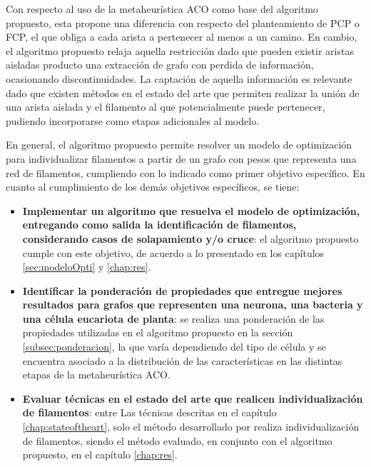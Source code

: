 Con respecto al uso de la metaheur\'istica ACO como base del algoritmo propuesto, esta propone una diferencia con respecto del planteamiento de PCP o FCP, el que obliga a cada arista a pertenecer al menos a un camino. En cambio, el algoritmo propuesto relaja aquella restricci\'on dado que pueden existir aristas aisladas producto una extracci\'on de grafo con perdida de informaci\'on, ocasionando discontinuidades. La captaci\'on de aquella informaci\'on es relevante dado que existen m\'etodos en el estado del arte que permiten realizar la uni\'on de una arista aislada y el filamento al que potencialmente puede pertenecer, pudiendo incorporarse como etapas adicionales al modelo. 

En general, el algoritmo propuesto permite resolver un modelo de optimizaci\'on para individualizar filamentos a partir de un grafo con pesos que representa una red de filamentos, cumpliendo con lo indicado como primer objetivo espec\'ifico. En cuanto al cumplimiento de los dem\'as objetivos espec\'ificos, se tiene:
\begin{itemize}
    \item {\bf Implementar un algoritmo que resuelva el modelo de optimizaci\'on, entregando como salida la identificaci\'on de filamentos, considerando casos de solapamiento y/o cruce}: el algoritmo propuesto cumple con este objetivo, de acuerdo a lo presentado en los cap\'itulos \ref{sec:modeloOpti} y \ref{chap:res}.
    
    \item {\bf Identificar la ponderaci\'on de propiedades que entregue mejores resultados para grafos que representen una neurona, una bacteria y una c\'elula eucariota de planta}: se realiza una ponderaci\'on de las propiedades utilizadas en el algoritmo propuesto en la secci\'on \ref{subsec:ponderacion}, la que var\'ia dependiendo del tipo de c\'elula y se encuentra asociado a la distribuci\'on de las caracter\'isticas en las distintas etapas de la metaheur\'istica ACO.
    
    \item {\bf Evaluar t\'ecnicas en el estado del arte que realicen individualizaci\'on de filamentos}: entre Las t\'ecnicas descritas en el cap\'itulo \ref{chap:stateoftheart}, solo el m\'etodo desarrollado por  realiza individualizaci\'on de filamentos, siendo el m\'etodo evaluado, en conjunto con el algoritmo propuesto, en el cap\'itulo \ref{chap:res}.
    
\end{itemize}


